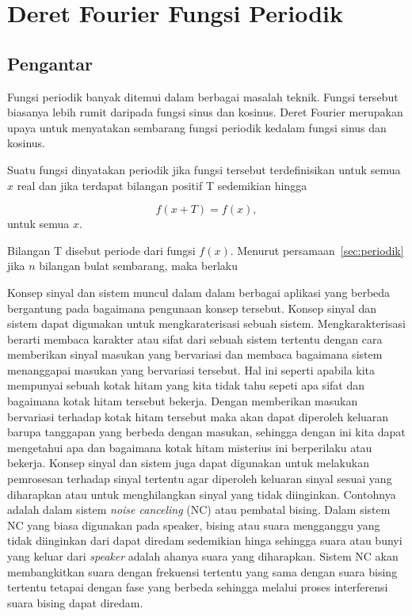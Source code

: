 \chapter{Deret Fourier Fungsi Periodik}

\section{Pengantar}
Fungsi periodik banyak ditemui dalam berbagai masalah teknik. Fungsi tersebut biasanya lebih rumit daripada fungsi sinus dan kosinus. Deret Fourier merupakan upaya untuk menyatakan sembarang fungsi periodik kedalam fungsi sinus dan kosinus.

Suatu fungsi dinyatakan periodik jika fungsi tersebut terdefinisikan untuk semua $x$ real dan jika terdapat bilangan positif T sedemikian hingga

\begin{equation}
\label{sec:periodik}
f(x+T)=f(x),  
\end{equation}
untuk semua $x$.

Bilangan T disebut periode dari fungsi $f(x)$. Menurut persamaan~\ref{sec:periodik} jika $n$ bilangan bulat  sembarang, maka berlaku

Konsep sinyal dan sistem muncul dalam dalam berbagai aplikasi yang berbeda bergantung pada bagaimana pengunaan konsep tersebut. Konsep sinyal dan sistem dapat digunakan untuk mengkaraterisasi sebuah sistem. Mengkarakterisasi berarti membaca karakter atau sifat dari sebuah sistem tertentu dengan cara memberikan sinyal masukan yang bervariasi dan membaca bagaimana sistem menanggapai masukan yang bervariasi tersebut. Hal ini seperti apabila kita mempunyai sebuah kotak hitam yang kita tidak tahu sepeti apa sifat dan bagaimana kotak hitam tersebut bekerja. Dengan memberikan masukan bervariasi terhadap kotak hitam tersebut maka akan dapat diperoleh keluaran barupa tanggapan yang berbeda dengan masukan, sehingga dengan ini kita dapat mengetahui apa dan bagaimana kotak hitam misterius ini berperilaku atau bekerja. Konsep sinyal dan sistem juga dapat digunakan untuk melakukan pemrosesan terhadap sinyal tertentu agar diperoleh keluaran sinyal sesuai yang diharapkan atau untuk menghilangkan sinyal yang tidak diinginkan. Contohnya adalah dalam sistem \textit{noise canceling} (NC) atau pembatal bising. Dalam sistem NC yang biasa digunakan pada speaker, bising atau suara mengganggu yang tidak diinginkan dari dapat diredam sedemikian hinga sehingga suara atau bunyi yang keluar dari \textit{speaker} adalah ahanya suara yang diharapkan. Sistem NC akan membangkitkan suara dengan frekuensi tertentu yang sama dengan suara bising tertentu tetapai dengan fase yang berbeda sehingga melalui proses interferensi suara bising dapat diredam. 

